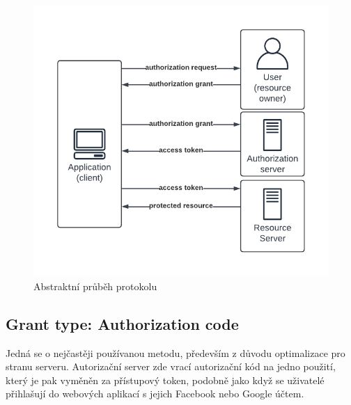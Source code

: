 \begin{figure}[H]
    \centering
    \includegraphics[width=\textwidth]{figures/OAuth_abstract_flow.pdf}
    \caption{Abstraktní průběh protokolu}%
    \label{fig:Oauth_roles_diagram}
\end{figure}


\subsection{Grant type: Authorization code}
Jedná se o nejčastěji používanou metodu, především z důvodu optimalizace pro stranu serveru. Autorizační server zde vrací autorizační kód na jedno použití, který je pak vyměněn za přístupový token, podobně jako když se uživatelé přihlašují do webových aplikací s jejich Facebook nebo Google účtem.

